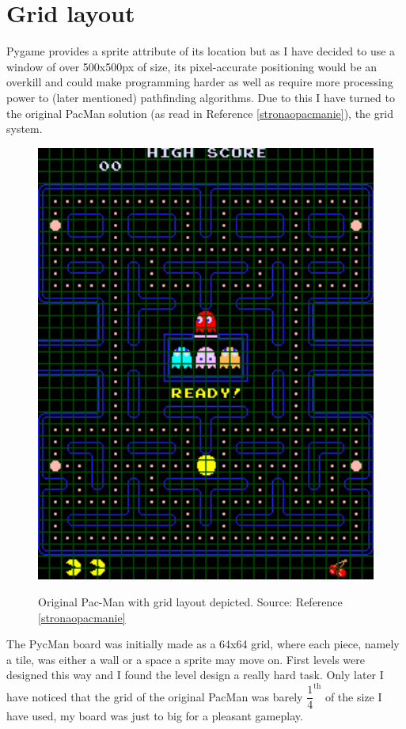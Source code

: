 \documentclass[11pt,a4paper,notitlepage]{report}
\newenvironment{img}{
	\begin{center}
		\begin{figure}[H]
			\begin{center}
			
}{
	\end{center}
		\end{figure}
			\end{center}
}
\begin{document}
		\section{Grid layout}
			\label{grid}
			Pygame provides a sprite attribute of its location but as I have decided to use a window of over 500x500px of size, its pixel-accurate positioning would be an overkill and could make programming harder as well as require more processing power to (later mentioned) pathfinding algorithms.
			Due to this I have turned to the original PacMan solution (as read in Reference \ref{stronaopacmanie}), the grid system.
			\begin{img}
				\includegraphics[width=350pt]{images/oryginal_pacman_grid}\\
				\caption{Original Pac-Man with grid layout depicted. Source: Reference \ref{stronaopacmanie}}
			\end{img}
			The PycMan board was initially made as a 64x64 grid, where each piece, namely a tile, was either a wall or a space a sprite may move on. First levels were designed this way and I found the level design a really hard task. Only later I have noticed that the grid of the original PacMan was barely $\dfrac{1}{4}^{\text{th}}$ of the size I have used, my board was just to big for a pleasant gameplay.
			
\end{document}
